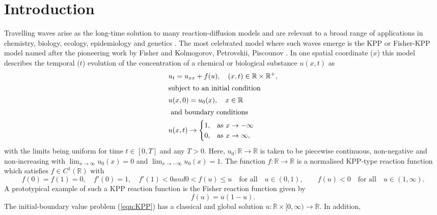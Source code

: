 \documentclass[11pt,a4paper]{article}
\newcommand{\eeref}[1]{(\ref{eqn:#1})}
\newcommand{\eelab}[1]{\label{eqn:#1}}
\def\beq{\begin{equation}}
\def\eeq{\end{equation}}
\begin{document}
\section{Introduction}
Travelling waves arise as the long-time solution
to  many reaction-diffusion models and are relevant to a broad range of applications in chemistry, biology, ecology, epidemiology and genetics  \cite{Fife1979,Murray2002}. The  most celebrated model where such waves emerge is the KPP or Fisher-KPP model
named after the pioneering work by Fisher \cite{Fisher1937}
and Kolmogorov, Petrovskii, Piscounov \cite{Kolmogorov_etal1937}. 
In one spatial coordinate ($x$) this model describes the temporal ($t$) evolution of the concentration of a chemical or biological substance  
 $u(x,t)$ as 
 \begin{subequations}\eelab{KPP}
 \begin{align}
 & u_t  = u_{xx} + f(u), \quad (x,t) \in \mathbb{R} \times \mathbb{R}^+,\eelab{KPPa}\\
 \intertext{subject to an   initial condition  }
 & u(x,0)=u_0(x), \quad x \in \mathbb{R} \eelab{KPPb} \\
\intertext{
and  boundary conditions}
  & u(x,t)  \to
	 \begin{cases}
		 1, & \text{as $x \to - \infty$}\\
	             0, & \text{as $x \to \infty$},
	\end{cases} \eelab{KPPc}
  \end{align}
 \end{subequations}
  with the limits being uniform for time $t\in[0,T]$ and any $T>0$.
%
Here, $u_0:\mathbb{R}\to\mathbb{R}$  is taken to be 
piecewise continuous, non-negative and non-increasing with 
$\lim_{x\to\infty}u_0(x)=0$ and $\lim_{x\to-\infty}u_0(x)=1$. 
The  function
  $f: \mathbb{R} \to \mathbb{R}$  is a normalised KPP-type reaction function which satisfies  $f \in C^1(\mathbb{R})$ 
with 
  \begin{subequations} \eelab{KPPreaction}
 	\beq
	  	f(0) = f(1)= 0,\quad f'(0)  = 1, \quad f'(1)  <0
	\eeq	
	 	and 
		\beq
	  	 0<f(u)\leq u   \quad  \text{for all}\quad    u \in (0,1),\quad
	 	\quad f(u) < 0 \quad  \text{for all}\quad    u \in (1,\infty).
	  	\eeq
	  \end{subequations}  
	  A prototypical example of such a KPP reaction function is the Fisher reaction function \cite{Fisher1937} given by 
	  \beq\eelab{Fisher}
	  	  f(u)=u(1-u).
	  \eeq
	  The initial-boundary value problem  \eeref{KPP} has a classical  and global solution $u: \mathbb{R}\times[0,\infty)\to\mathbb{R}$. In addition, 
\end{document}
